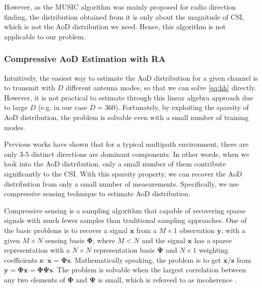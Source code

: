 However, as the MUSIC algorithm was mainly proposed for radio direction finding, the distribution obtained from it is only about the magnitude of CSI, which is not the AoD distribution we need. 
Hence, this algorithm is not applicable to our problem.

\subsubsection{Compressive AoD Estimation with RA}
Intuitively, the easiest way to estimate the AoD distribution for a given channel is to transmit with $D$ different antenna modes, so that we can solve \eqref{eq:hh} directly. However, it is not practical to estimate through this linear algebra approach due to large $D$ (e.g. in our case $D = 360$). Fortunately, by exploiting the sparsity of AoD distribution, the problem is solvable even with a small number of training modes. 


Previous works \cite{ghassemzadeh2004measurement,czink2007cluster} have shown that for a typical multipath environment, there are only 3-5 distinct directions are dominant components. In other words, when we look into the AoD distribution, only a small number of them contribute significantly to the CSI. With this sparsity property, we can recover the AoD distribution from only a small number of measurements. Specifically, we use compressive sensing technique \cite{candes2008introduction} to estimate AoD distribution. 

Compressive sensing is a sampling algorithm that capable of recovering sparse signals with much fewer samples than traditional sampling approaches. One of the basic problems is to recover a signal $\mathbf{x}$ from a $M \times 1$ observation $\mathbf{y}$, with a given $M \times N$ sensing basis $\mathbf{\Phi}$, where $M < N$ and the signal $\mathbf{x}$ has a sparse representation with a $N \times N$ representation basis $\mathbf{\Psi}$ and $N \times 1$ weighting coefficients $\mathbf{s}$: $\mathbf{x} = \mathbf{\Psi s}$.  Mathematically speaking, the problem is to get $\mathbf{x}$/$\mathbf{s}$ from    
$\mathbf{y} = \mathbf{\Phi x} = \mathbf{\Phi \Psi s}$. The problem is solvable when the largest correlation between any two elements of $\mathbf{\Phi}$ and $\mathbf{\Psi}$ is small, which is refereed to as incoherence \cite{candes2008introduction}.

